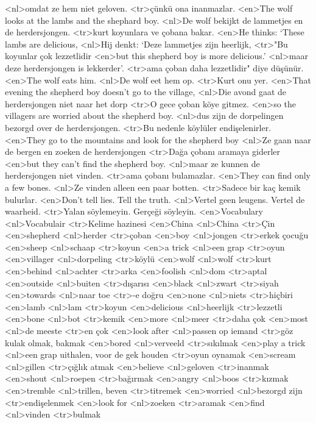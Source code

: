 <nl>omdat ze hem niet geloven.
<tr>çünkü ona inanmazlar.
<en>The wolf looks at the lambs and the shephard boy.
<nl>De wolf bekijkt de lammetjes en de herdersjongen. 
<tr>kurt koyunlara ve çobana bakar.
<en>He thinks: `These lambs are delicious,
<nl>Hij denkt: `Deze lammetjes zijn heerlijk, 
<tr>"Bu koyunlar çok lezzetlidir 
<en>but this shepherd boy is more delicious.'
<nl>maar deze herdersjongen is lekkerder'.
<tr>ama çoban daha lezzetlidir" diye düşünür.
<en>The wolf eats him.
<nl>De wolf eet hem op.
<tr>Kurt onu yer.
<en>That evening the shepherd boy doesn’t go to the village,
<nl>Die avond gaat de herdersjongen niet naar het dorp
<tr>O gece çoban köye gitmez.
<en>so  the villagers are worried about the shepherd boy.
<nl>dus zijn de dorpelingen bezorgd over de herdersjongen. 
<tr>Bu nedenle köylüler endişelenirler.
<en>They go to the mountains and look for the shepherd boy
<nl>Ze gaan naar de bergen en zoeken de herdersjongen 
<tr>Dağa çobanı aramaya giderler
<en>but they can’t find the shepherd boy.
<nl>maar ze kunnen de herdersjongen niet vinden.
<tr>ama çobanı bulamazlar.
<en>They can find only a few bones.
<nl>Ze vinden alleen een paar botten. 
<tr>Sadece bir kaç kemik bulurlar.
<en>Don’t tell lies. Tell the truth.
<nl>Vertel geen leugens. Vertel de waarheid.
<tr>Yalan söylemeyin. Gerçeği söyleyin.
<en>Vocabulary
<nl>Vocabulair
<tr>Kelime hazinesi
<en>China
<nl>China
<tr>Çin
<en>shepherd
<nl>herder
<tr>çoban
<en>boy
<nl>jongen
<tr>erkek çocuğu
<en>sheep
<nl>schaap
<tr>koyun
<en>a trick
<nl>een grap
<tr>oyun
<en>villager
<nl>dorpeling
<tr>köylü
<en>wolf
<nl>wolf
<tr>kurt
<en>behind
<nl>achter
<tr>arka
<en>foolish
<nl>dom
<tr>aptal
<en>outside
<nl>buiten
<tr>dışarısı
<en>black
<nl>zwart
<tr>siyah
<en>towards
<nl>naar toe
<tr>-e doğru
<en>none
<nl>niets
<tr>hiçbiri
<en>lamb
<nl>lam
<tr>koyun
<en>delicious
<nl>heerlijk
<tr>lezzetli
<en>bone
<nl>bot
<tr>kemik
<en>more
<nl>meer
<tr>daha çok
<en>most
<nl>de meeste
<tr>en çok
<en>look after
<nl>passen op iemand
<tr>göz kulak olmak, bakmak
<en>bored
<nl>verveeld
<tr>sıkılmak
<en>play a trick
<nl>een grap uithalen, voor de gek houden
<tr>oyun oynamak
<en>scream
<nl>gillen
<tr>çığlık atmak
<en>believe
<nl>geloven
<tr>inanmak
<en>shout
<nl>roepen
<tr>bağırmak
<en>angry
<nl>boos
<tr>kızmak
<en>tremble
<nl>trillen, beven
<tr>titremek
<en>worried
<nl>bezorgd zijn
<tr>endişelenmek
<en>look for
<nl>zoeken
<tr>aramak
<en>find
<nl>vinden
<tr>bulmak
